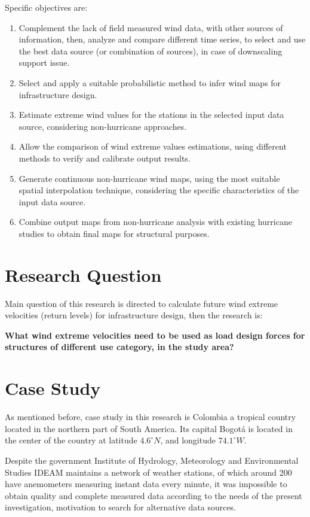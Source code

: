 \documentclass[12pt,twoside]{reedthesis}
\begin{document}
Specific objectives are:
\begin{enumerate}
\def\labelenumi{\arabic{enumi}.}
\item
  Complement the lack of field measured wind data, with other sources of information, then, analyze and compare different time series, to select and use the best data source (or combination of sources), in case of downscaling support issue.
\item
  Select and apply a suitable probabilistic method to infer wind maps for infrastructure design.
\item
  Estimate extreme wind values for the stations in the selected input data source, considering non-hurricane approaches.
\item
  Allow the comparison of wind extreme values estimations, using different methods to verify and calibrate output results.
\item
  Generate continuous non-hurricane wind maps, using the most suitable spatial interpolation technique, considering the specific characteristics of the input data source.
\item
  Combine output maps from non-hurricane analysis with existing hurricane studies to obtain final maps for structural purposes.
\end{enumerate}
\hypertarget{research-question}{%
\section{Research Question}\label{research-question}}

Main question of this research is directed to calculate future wind extreme velocities (return levels) for infrastructure design, then the research is:

\textbf{What wind extreme velocities need to be used as load design forces for structures of different use category, in the study area?}

\hypertarget{case-study}{%
\section{Case Study}\label{case-study}}

As mentioned before, case study in this research is Colombia a tropical country located in the northern part of South America. Its capital Bogotá is located in the center of the country at latitude \(4.6^\circ N\), and longitude \(74.1^\circ W\).

Despite the government Institute of Hydrology, Meteorology and Environmental Studies IDEAM maintains a network of weather stations, of which around 200 have anemometers measuring instant data every minute, it was impossible to obtain quality and complete measured data according to the needs of the present investigation, motivation to search for alternative data sources.
\end{document}
